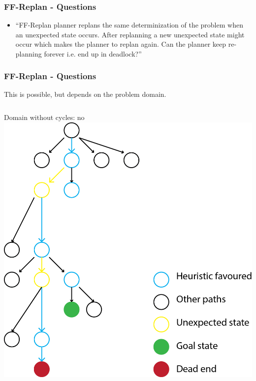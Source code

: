 \documentclass{beamer}
\let\origframetitle=\frametitle
\renewcommand\frametitle[1]{\origframetitle{\textbf{\large{\textrm{#1}}}}}
\begin{document}
\begin{frame}
  \frametitle{FF-Replan - Questions}
  \begin{itemize}
    \item ``FF-Replan planner replans the same determinization of the problem when an unexpected state occurs. After replanning a new unexpected state might occur which makes the planner to replan again. Can the planner keep re- planning forever i.e. end up in deadlock?''

   \end{itemize}
\end{frame}

\begin{frame}
  \frametitle{FF-Replan - Questions}

This is possible, but depends on the problem domain.
\vspace{1cm}
\begin{columns}
 Domain without cycles: no
\includegraphics[scale=0.4]{images/Question1a.png}


\end{columns}
\end{frame}
\end{document}

